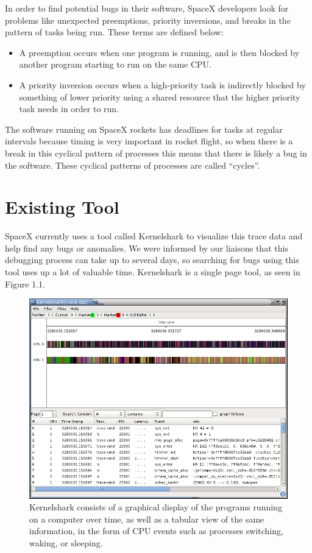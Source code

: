 \documentclass{hmcclinic}
\begin{document}
In order to find potential bugs in their software, SpaceX developers look for
problems like unexpected preemptions, priority inversions, and breaks in the
pattern of tasks being run. These terms are defined below:
\begin{itemize}
\item A preemption occurs when one program is running, and
is then blocked by another program starting to run on the same CPU. 
\item A priority
inversion occurs when a high-priority task is indirectly blocked by something of
lower priority using a shared resource that the higher priority task needs in
order to run. 
\end{itemize}
The software running on SpaceX rockets has deadlines for tasks at regular intervals because timing is very important in rocket flight, so when there is a break in this cyclical pattern of processes this means that there is likely a bug in the software. These cyclical patterns of processes are called ``cycles''.
\section{Existing Tool}
SpaceX currently uses a tool called Kernelshark to visualize this trace data and help find any bugs or anomalies. We were informed by our liaisons that this debugging process can take up to several days, so searching for bugs using this tool uses up a lot of valuable time. Kernelshark is a single page tool, as seen in Figure 1.1.

\begin{figure}[h!]
  \centering
      \includegraphics[width=5in]{kshark-open.png}
  \caption{Kernelshark consists of a graphical display of the programs running on a computer over time, as well as a tabular view of the same information, in the form of CPU events such as processes switching, waking, or sleeping.}
\end{figure}
\end{document}
